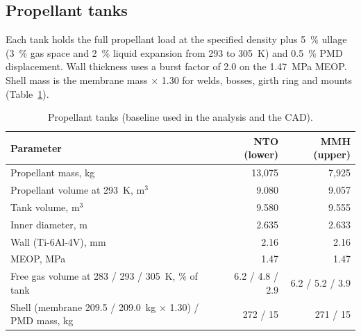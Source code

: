 \documentclass[10pt]{article}
\begin{document}
\subsection{Propellant tanks}
Each tank holds the full propellant load at the specified density plus 5~\% ullage (3~\% gas space and 2~\% liquid
expansion from 293 to 305~K) and 0.5~\% PMD displacement. Wall thickness uses a burst factor of 2.0 on the 1.47~MPa
MEOP. Shell mass is the membrane mass $\times$ 1.30 for welds, bosses, girth ring and mounts (Table~\ref{tab:tanks}).
\begin{table}[H]\centering\small\caption{Propellant tanks (baseline used in the analysis and the CAD).}\label{tab:tanks}
\begin{tabular}{lrr}\toprule
Parameter & NTO (lower) & MMH (upper) \\\midrule
Propellant mass, kg & 13{,}075 & 7{,}925 \\
Propellant volume at 293~K, m$^3$ & 9.080 & 9.057 \\
Tank volume, m$^3$ & 9.580 & 9.555 \\
Inner diameter, m & 2.635 & 2.633 \\
Wall (Ti-6Al-4V), mm & 2.16 & 2.16 \\
MEOP, MPa & 1.47 & 1.47 \\
Free gas volume at 283 / 293 / 305~K, \% of tank & 6.2 / 4.8 / 2.9 & 6.2 / 5.2 / 3.9 \\
Shell (membrane 209.5 / 209.0~kg $\times$ 1.30) / PMD mass, kg & 272 / 15 & 271 / 15 \\
\bottomrule\end{tabular}\end{table}
\end{document}
